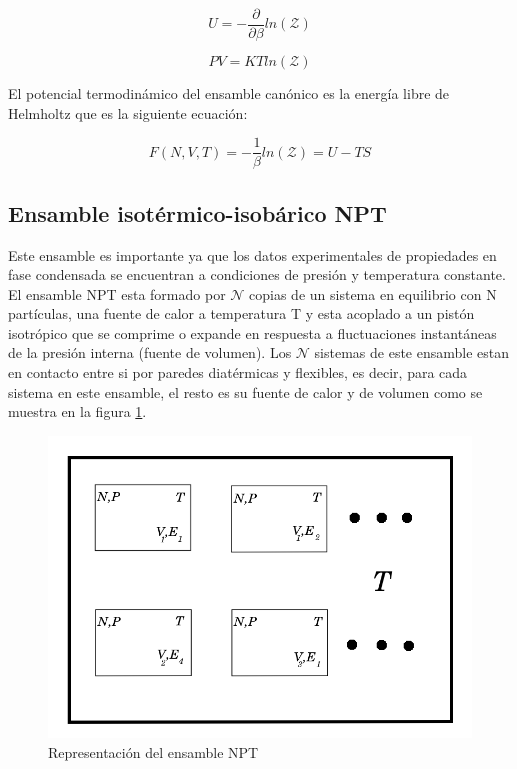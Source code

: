 \begin{equation} \label{energcan}
    U=-\frac{\partial}{\partial \beta}ln(\mathcal{Z})
\end{equation}

\begin{equation} \label{ecestacan}
    PV=KTln(\mathcal{Z})
\end{equation}

El potencial termodinámico del ensamble canónico es la energía libre de Helmholtz que es la siguiente ecuación:

\begin{equation} \label{potHelm}
    F(N,V,T)=-\frac{1}{\beta}ln(\mathcal{Z})=U-TS
\end{equation}

\subsection{Ensamble isotérmico-isobárico NPT}

Este ensamble es importante ya que los datos experimentales de propiedades en fase condensada se encuentran a condiciones de presión y temperatura constante.\\

El ensamble NPT esta formado por $\mathcal{N}$ copias de un sistema en equilibrio con N partículas, una fuente de calor a temperatura T y esta acoplado a un pistón isotrópico que se comprime o expande en respuesta a fluctuaciones instantáneas de la presión interna (fuente de volumen). Los $\mathcal{N}$ sistemas de este ensamble estan en contacto entre si por paredes diatérmicas y flexibles, es decir, para cada sistema en este ensamble, el resto es su fuente de calor y de volumen como se muestra en la figura \ref{fig:NPTEns}.\\

\begin{figure}[!h]
    \centering
    \includegraphics[width=.55\textwidth,keepaspectratio=true]{nptensemble.png}
    \caption{Representación del ensamble NPT \cite{belof2013alternative}}
    \label{fig:NPTEns}
\end{figure}

